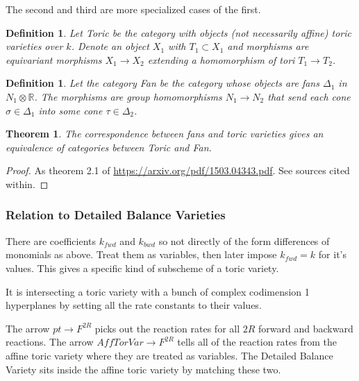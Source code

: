 \documentclass[11pt]{book}
\theoremstyle{change}
\newtheorem{definition}[equation]{Definition}
\newtheorem{theorem}[equation]{Theorem}
\theoremstyle{nonumberplain}
\newtheorem{proof}{Proof}
\numberwithin{equation}{section}
\begin{document}
The second and third are more specialized cases of the first.

\begin{definition}
Let Toric be the category with objects (not necessarily affine) toric varieties over $k$. Denote an object $X_1$ with $T_1 \subset X_1$ and morphisms are equivariant morphisms $X_1 \to X_2$ extending a homomorphism of tori $T_1 \to T_2$.
\end{definition}

\begin{definition}
Let the category Fan be the category whose objects are fans $\Delta_1$ in $N_1 \otimes \mathbb{R}$. The morphisms are group homomorphisms $N_1 \to N_2$ that send each cone $\sigma \in \Delta_1$ into some cone $\tau \in \Delta_2$.
\end{definition}

\begin{theorem}
The correspondence between fans and toric varieties gives an equivalence of categories between Toric and Fan.
\end{theorem}

\begin{proof}
As theorem 2.1 of \url{https://arxiv.org/pdf/1503.04343.pdf}. See sources cited within.
\end{proof}

\subsubsection{Relation to Detailed Balance Varieties}

There are coefficients $k_{fwd}$ and $k_{bwd}$ so not directly of the form differences of monomials as above. Treat them as variables, then later impose $k_{fwd} = k$ for it's values. This gives a specific kind of subscheme of a toric variety.

It is intersecting a toric variety with a bunch of complex codimension 1 hyperplanes by setting all the rate constants to their values.


The arrow $pt \to F^{2R}$ picks out the reaction rates for all $2R$ forward and backward reactions. The arrow $AffTorVar \to F^{2R}$ tells all of the reaction rates from the affine toric variety where they are treated as variables. The Detailed Balance Variety sits inside the affine toric variety by matching these two.
\end{document}
